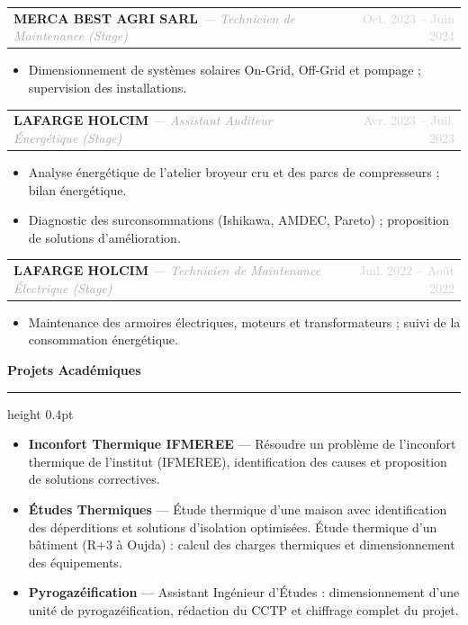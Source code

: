 \documentclass[9pt, a4paper]{article}
\makeatletter
\newcommand{\cvsection}[1]{%
  \vspace{3pt}
  {\normalsize \textbf{\textcolor{accentblue}{#1}}}
  \vspace{1pt}
  \hrule height 0.4pt
  \vspace{3pt}
}
\newcommand{\cventry}[3]{%
  \begin{tabularx}{\linewidth}{@{}X r@{}}
    \textbf{#1} \textit{\textcolor{darkgray}{ --- #2}} & \textcolor{lightgray}{\small #3}
  \end{tabularx}\vspace{-1pt}
}
\makeatother
\begin{document}
\vspace{2pt}
\cventry{MERCA BEST AGRI SARL}{Technicien de Maintenance (Stage)}{Oct. 2023 -- Juin 2024}
\begin{itemize}[leftmargin=1em, itemsep=0pt, topsep=1pt, parsep=0pt, label={---}]
  \item Dimensionnement de systèmes solaires On-Grid, Off-Grid et pompage ; supervision des installations.
\end{itemize}

\vspace{2pt}
\cventry{LAFARGE HOLCIM}{Assistant Auditeur Énergétique (Stage)}{Avr. 2023 -- Juil. 2023}
\begin{itemize}[leftmargin=1em, itemsep=0pt, topsep=1pt, parsep=0pt, label={---}]
  \item Analyse énergétique de l'atelier broyeur cru et des parcs de compresseurs ; bilan énergétique.
  \item Diagnostic des surconsommations (Ishikawa, AMDEC, Pareto) ; proposition de solutions d'amélioration.
\end{itemize}

\vspace{2pt}
\cventry{LAFARGE HOLCIM}{Technicien de Maintenance Électrique (Stage)}{Juil. 2022 -- Août 2022}
\begin{itemize}[leftmargin=1em, itemsep=0pt, topsep=1pt, parsep=0pt, label={---}]
  \item Maintenance des armoires électriques, moteurs et transformateurs ; suivi de la consommation énergétique.
\end{itemize}

\vspace{5pt}
\cvsection{Projets Académiques}
\begin{itemize}[leftmargin=1em, itemsep=3pt, topsep=0pt, parsep=0pt, label={---}]
  \item \textbf{Inconfort Thermique IFMEREE} --- Résoudre un problème de l'inconfort thermique de l'institut (IFMEREE), identification des causes et proposition de solutions correctives.
  \item \textbf{Études Thermiques} --- Étude thermique d'une maison avec identification des déperditions et solutions d'isolation optimisées. Étude thermique d'un bâtiment (R+3 à Oujda) : calcul des charges thermiques et dimensionnement des équipements.
  \item \textbf{Pyrogazéification} --- Assistant Ingénieur d'Études : dimensionnement d'une unité de pyrogazéification, rédaction du CCTP et chiffrage complet du projet.
\end{itemize}
\end{document}
